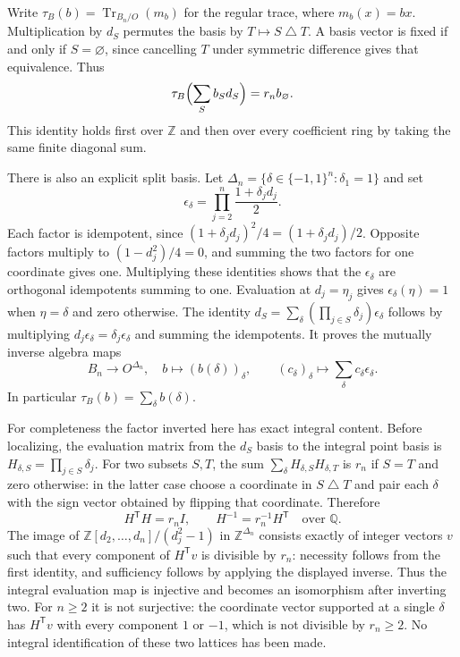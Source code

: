 Write $\tau_B(b)=\operatorname{Tr}_{B_n/O}(m_b)$ for the regular
trace, where $m_b(x)=bx$. Multiplication by $d_S$ permutes the basis
by $T\mapsto S\mathbin{\triangle}T$. A basis vector is fixed if
and only if $S=\varnothing$, since cancelling $T$ under symmetric
difference gives that equivalence. Thus
\begin{equation}\label{eq:compressed-regular-trace}
 \tau_B\Bigl(\sum_S b_Sd_S\Bigr)=r_n b_\varnothing.
\end{equation}
This identity holds first over $\mathbb Z$ and then over every
coefficient ring by taking the same finite diagonal sum.

There is also an explicit split basis. Let
$\Delta_n=\{\delta\in\{-1,1\}^n:\delta_1=1\}$ and set
\[
 \epsilon_\delta=\prod_{j=2}^n\frac{1+\delta_jd_j}{2}.
\]
Each factor is idempotent, since
$(1+\delta_jd_j)^2/4=(1+\delta_jd_j)/2$.
Opposite factors multiply to $(1-d_j^2)/4=0$, and summing the
two factors for one coordinate gives one. Multiplying these identities
shows that the $\epsilon_\delta$ are orthogonal idempotents summing
to one. Evaluation at $d_j=\eta_j$ gives
$\epsilon_\delta(\eta)=1$ when $\eta=\delta$ and zero otherwise.
The identity
$d_S=\sum_\delta(\prod_{j\in S}\delta_j)\epsilon_\delta$
follows by multiplying $d_j\epsilon_\delta=\delta_j\epsilon_\delta$
and summing the idempotents. It proves the mutually inverse algebra maps
\[
 B_n\longrightarrow O^{\Delta_n},\quad b\longmapsto(b(\delta))_\delta,
 \qquad(c_\delta)_\delta\longmapsto\sum_\delta c_\delta\epsilon_\delta.
\]
In particular $\tau_B(b)=\sum_\delta b(\delta)$.

For completeness the factor inverted here has exact integral content.
Before localizing, the evaluation matrix from the $d_S$ basis to
the integral point basis is
$H_{\delta,S}=\prod_{j\in S}\delta_j$. For two subsets $S,T$,
the sum $\sum_\delta H_{\delta,S}H_{\delta,T}$ is $r_n$ if
$S=T$ and zero otherwise: in the latter case choose a coordinate
in $S\mathbin{\triangle}T$ and pair each $\delta$ with the sign
vector obtained by flipping that coordinate. Therefore
\[
 H^{\mathsf T}H=r_n I,\qquad H^{-1}=r_n^{-1}H^{\mathsf T}
 \quad\text{over }\mathbb Q.
\]
The image of $\mathbb Z[d_2,\ldots,d_n]/(d_j^2-1)$ in
$\mathbb Z^{\Delta_n}$ consists exactly of integer vectors $v$
such that every component of $H^{\mathsf T}v$ is divisible by $r_n$:
necessity follows from the first identity, and sufficiency follows
by applying the displayed inverse. Thus the integral evaluation map
is injective and becomes an isomorphism after inverting two. For
$n\ge2$ it is not surjective: the coordinate vector supported at
a single $\delta$ has $H^{\mathsf T}v$ with every component $1$
or $-1$, which is not divisible by $r_n\ge2$.
No integral identification of these two lattices has been made.

